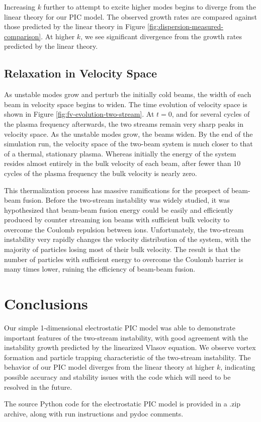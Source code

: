 \documentclass[%
 reprint,
 amsmath,amssymb,
 aps,
]{revtex4-2}
\begin{document}
Increasing $k$ further to attempt to excite higher modes begins to diverge from the linear theory for our PIC model. The observed growth rates are compared against those predicted by the linear theory in Figure \ref{fig:dispersion-measured-comparison}. At higher $k$, we see significant divergence from the growth rates predicted by the linear theory. 

\subsection{Relaxation in Velocity Space}


As unstable modes grow and perturb the initially cold beams, the width of each beam in velocity space begins to widen. The time evolution of velocity space is shown in Figure \ref{fig:fv-evolution-two-stream}. At $t=0$, and for several cycles of the plasma frequency afterwards, the two streams remain very sharp peaks in velocity space. As the unstable modes grow, the beams widen. By the end of the simulation run, the velocity space of the two-beam system is much closer to that of a thermal, stationary plasma. Whereas initially the energy of the system resides almost entirely in the bulk velocity of each beam, after fewer than 10 cycles of the plasma frequency the bulk velocity is nearly zero.

This thermalization process has massive ramifications for the prospect of beam-beam fusion. Before the two-stream instability was widely studied, it was hypothesized that beam-beam fusion energy could be easily and efficiently produced by counter streaming ion beams with sufficient bulk velocity to overcome the Coulomb repulsion between ions. Unfortunately, the two-stream instability very rapidly changes the velocity distribution of the system, with the majority of particles losing most of their bulk velocity. The result is that the number of particles with sufficient energy to overcome the Coulomb barrier is many times lower, ruining the efficiency of beam-beam fusion.

\section{Conclusions}

Our simple 1-dimensional electrostatic PIC model was able to demonstrate important features of the two-stream instability, with good agreement with the instability growth predicted by the linearized Vlasov equation. We observe vortex formation and particle trapping characteristic of the two-stream instability. The behavior of our PIC model diverges from the linear theory at higher $k$, indicating possible accuracy and stability issues with the code which will need to be resolved in the future.

The source Python code for the electrostatic PIC model is provided in a .zip archive, along with run instructions and pydoc comments.


\end{document}
